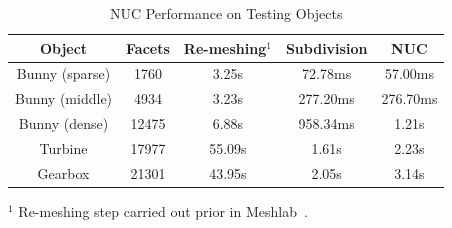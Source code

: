 \documentclass[lettersize,journal]{IEEEtran}
\begin{document}
\begin{table}[t]
\centering
\caption{NUC Performance on Testing Objects}\label{tab:computation_time}
\begin{tabular}{c|c|c|c|c}
\hline
Object & Facets & Re-meshing$^1$ & Subdivision & NUC \\
\hline
\hline
Bunny (sparse) & 1760 & 3.25s& 72.78ms& 57.00ms\\
\hline
Bunny (middle) & 4934 & 3.23s& 277.20ms& 276.70ms\\
\hline
Bunny (dense) & 12475& 6.88s& 958.34ms& 1.21s\\
\hline
Turbine & 17977& 55.09s& 1.61s& 2.23s\\
\hline
Gearbox & 21301& 43.95s& 2.05s& 3.14s\\
\hline
\end{tabular}
\begin{tablenotes}
\item $^1$ Re-meshing step carried out prior in Meshlab~\cite{Cignoni2008Meshlab}.
\end{tablenotes}
\end{table}
\end{document}
